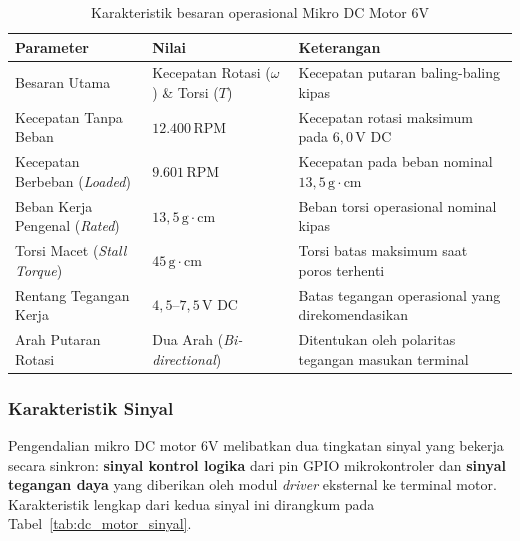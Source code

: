 \begin{table}[H]
	\centering
	\caption{Karakteristik besaran operasional Mikro DC Motor 6V}
	\label{tab:dc_motor_karakteristik_besaran}
	\small
	\begin{tabularx}{\textwidth}{@{} p{3.8cm} >{\hsize=0.8\hsize}X >{\hsize=1.2\hsize}X @{}}
		\toprule
		Parameter                             & Nilai                                      & Keterangan                                                    \\
		\midrule
		Besaran Utama                         & Kecepatan Rotasi ($\omega$) \& Torsi ($T$) & Kecepatan putaran baling-baling kipas                         \\
		Kecepatan Tanpa Beban                 & $12.400\,\text{RPM}$                       & Kecepatan rotasi maksimum pada $6{,}0\,\text{V DC}$           \\
		Kecepatan Berbeban (\textit{Loaded})  & $9.601\,\text{RPM}$                        & Kecepatan pada beban nominal $13{,}5\,\text{g}\cdot\text{cm}$ \\
		Beban Kerja Pengenal (\textit{Rated}) & $13{,}5\,\text{g}\cdot\text{cm}$           & Beban torsi operasional nominal kipas                         \\
		Torsi Macet (\textit{Stall Torque})   & $45\,\text{g}\cdot\text{cm}$               & Torsi batas maksimum saat poros terhenti                      \\
		Rentang Tegangan Kerja                & $4{,}5\text{--}7{,}5\,\text{V DC}$         & Batas tegangan operasional yang direkomendasikan              \\
		Arah Putaran Rotasi                   & Dua Arah (\textit{Bi-directional})         & Ditentukan oleh polaritas tegangan masukan terminal           \\
		\bottomrule
	\end{tabularx}
\end{table}

\subsubsection{Karakteristik Sinyal}
Pengendalian mikro DC motor 6V melibatkan dua tingkatan sinyal yang bekerja secara sinkron: \textbf{sinyal kontrol logika} dari pin GPIO mikrokontroler dan \textbf{sinyal tegangan daya} yang diberikan oleh modul \textit{driver} eksternal ke terminal motor. Karakteristik lengkap dari kedua sinyal ini dirangkum pada Tabel~\ref{tab:dc_motor_sinyal}.

